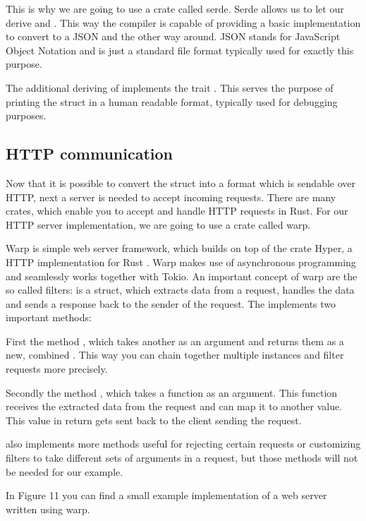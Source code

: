This is why we are going to use a crate called serde. Serde allows us to let our  derive 
and . This way the compiler is capable of providing a basic implementation to convert  to
a JSON  and the other way around. JSON stands for JavaScript Object Notation and is just a standard file
format typically used for exactly this purpose.

The additional deriving of  implements the trait . This serves the purpose of
printing the struct in a human readable format, typically used for debugging purposes.

\subsection{HTTP communication}
Now that it is possible to convert the struct into a format which is sendable over HTTP, next a server is needed to
accept incoming requests. There are many crates, which enable you to accept and handle HTTP requests in Rust. For our
HTTP server implementation, we are going to use a crate called warp.

Warp is simple web server framework, which builds on top of the crate Hyper, a HTTP implementation for Rust
\cite{warp-doc}. Warp makes use of asynchronous programming and seamlessly works together with Tokio. An important
concept of warp are the so called filters:  is a struct, which extracts data from a request, handles
the data and sends a response back to the sender of the request. The  implements two important methods:

First the method , which takes another  as an argument and returns
them as a new, combined . This way you can chain together multiple  instances and filter
requests more precisely.

Secondly the method , which takes a function as an argument. This function receives the extracted data from
the request and can map it to another value. This value in return gets sent back to the client sending the request.

 also implements more methods useful for rejecting certain requests or customizing filters to take
different sets of arguments in a request, but those methods will not be needed for our example.

In Figure 11 you can find a small example implementation of a web server written using warp.

